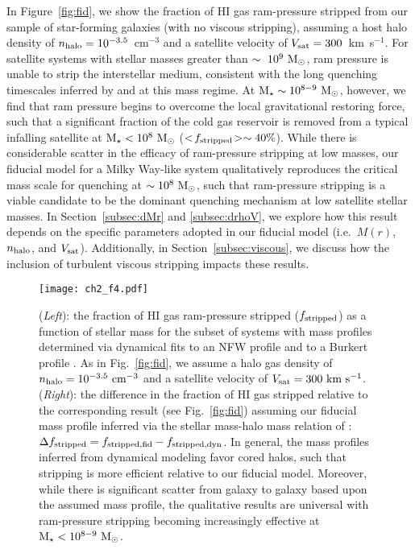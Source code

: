 In Figure~\ref{fig:fid}, we show the fraction of H{\scriptsize I} gas
ram-pressure stripped from our sample of star-forming galaxies (with
no viscous stripping), assuming a host halo density of $n_{\rm halo} =
10^{-3.5}$~cm$^{-3}$ and a satellite velocity of $V_{\rm sat} =
300$~km~s$^{-1}$.
%
For satellite systems with stellar masses greater than
$\sim~10^{9}~{\rm M}_{\odot}$, ram pressure is unable to strip the interstellar
medium, consistent with the long quenching timescales inferred by
\citet{wheeler14} and \citet{fham15} at this mass regime.
% 
At ${\rm M}_{\star} \sim 10^{8-9}~{\rm M}_{\odot}$, however, we find that ram pressure
begins to overcome the local gravitational restoring force, such that
a significant fraction of the cold gas reservoir is removed from a
typical infalling satellite at ${\rm M}_{\star} < 10^{8}~{\rm M}_{\odot}$ ($<\!f_{\rm
  stripped}\!> \sim 40\%$).
%
While there is considerable scatter in the efficacy of ram-pressure
stripping at low masses, our fiducial model for a Milky Way-like
system qualitatively reproduces the critical mass scale for quenching
at $\sim10^{8}~{\rm M}_{\odot}$, such that ram-pressure stripping is a viable
candidate to be the dominant quenching mechanism at low satellite
stellar masses.
%
In Section~\ref{subsec:dMr} and \ref{subsec:drhoV}, we explore how
this result depends on the specific parameters adopted in our fiducial
model (i.e.~$M(r)$, $n_{\rm halo}$, and $V_{\rm sat}$). Additionally,
in Section~\ref{subsec:viscous}, we discuss how the inclusion of
turbulent viscous stripping impacts these results.


\begin{figure*}
 \centering
 \hspace*{-0.25in}
   \texttt{[image: ch2\_f4.pdf]}
   \caption{(\emph{Left}): the fraction of H{\scriptsize I} gas
     ram-pressure stripped ($f_{\rm stripped}$) as a function of
     stellar mass for the subset of systems with mass profiles
     determined via dynamical fits to an NFW profile \citep{deblok08,
       oh15} and to a Burkert profile \citep{pace16}. As in
     Fig.~\ref{fig:fid}, we assume a halo gas density of $n_{\rm
       halo}=10^{-3.5}~{\rm cm}^{-3}$ and a satellite velocity of
     $V_{\rm sat}=300~{\rm km}~{\rm s}^{-1}$. (\emph{Right}): the
     difference in the fraction of H{\scriptsize I} gas stripped
     relative to the corresponding result (see Fig.~\ref{fig:fid})
     assuming our fiducial mass profile inferred via the stellar
     mass-halo mass relation of \citet{gk14}: ${\Delta}f_{\rm
       stripped} = f_{\rm stripped, fid} - f_{\rm stripped, dyn}$. In
     general, the mass profiles inferred from dynamical modeling favor
     cored halos, such that stripping is more efficient relative to
     our fiducial model. Moreover, while there is significant scatter
     from galaxy to galaxy based upon the assumed mass profile, the
     qualitative results are universal with ram-pressure stripping
     becoming increasingly effective at ${\rm M}_{\star}<10^{8-9}~{\rm M}_{\odot}$. }
 \label{fig:mass}
\end{figure*}
 


